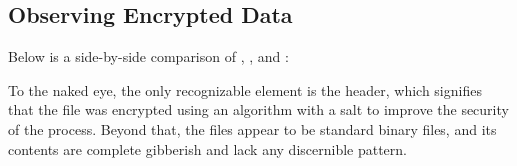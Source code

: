 \subsection{Observing Encrypted Data}
Below is a side-by-side comparison of , ,
and :

To the naked eye, the only recognizable element is the  header, 
which signifies that the file was encrypted using an algorithm with a salt 
to improve the security of the process. Beyond that, the files appear to be 
standard binary files, and its contents are complete gibberish and lack any 
discernible pattern.
